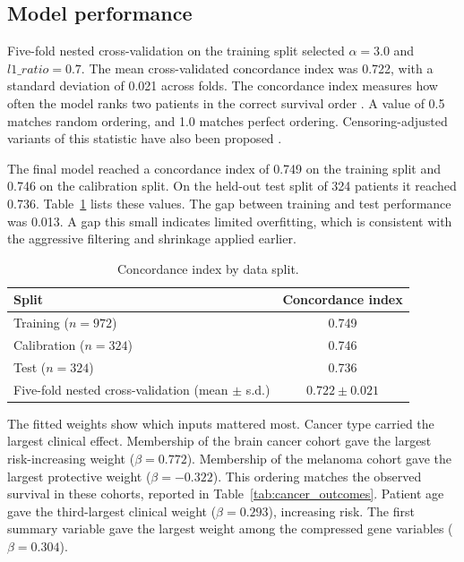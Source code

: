 \documentclass[10pt,a4paper]{article}
\begin{document}
\subsection{Model performance}

Five-fold nested cross-validation on the training split selected $\alpha = 3.0$
and $l1\_ratio = 0.7$. The mean cross-validated concordance index was 0.722,
with a standard deviation of 0.021 across folds. The concordance index measures
how often the model ranks two patients in the correct survival order
\citep{harrell1982evaluating}. A value of 0.5 matches random ordering, and 1.0
matches perfect ordering. Censoring-adjusted variants of this statistic have also
been proposed \citep{uno2011c}.

The final model reached a concordance index of 0.749 on the training split and
0.746 on the calibration split. On the held-out test split of 324 patients it
reached 0.736. Table~\ref{tab:cindex} lists these values. The gap between training
and test performance was 0.013. A gap this small indicates limited overfitting,
which is consistent with the aggressive filtering and shrinkage applied earlier.

\begin{table}[!htbp]
\centering
\caption{Concordance index by data split.}
\label{tab:cindex}
\begin{tabular}{lc}
\toprule
Split & Concordance index \\
\midrule
Training ($n = 972$) & 0.749 \\
Calibration ($n = 324$) & 0.746 \\
Test ($n = 324$) & 0.736 \\
Five-fold nested cross-validation (mean $\pm$ s.d.) & $0.722 \pm 0.021$ \\
\bottomrule
\end{tabular}
\end{table}

The fitted weights show which inputs mattered most. Cancer type carried the
largest clinical effect. Membership of the brain cancer cohort gave the largest
risk-increasing weight ($\beta = 0.772$). Membership of the melanoma cohort gave
the largest protective weight ($\beta = -0.322$). This ordering matches the
observed survival in these cohorts, reported in
Table~\ref{tab:cancer_outcomes}. Patient age gave the third-largest clinical
weight ($\beta = 0.293$), increasing risk. The first summary variable gave the
largest weight among the compressed gene variables ($\beta = 0.304$).
\end{document}
